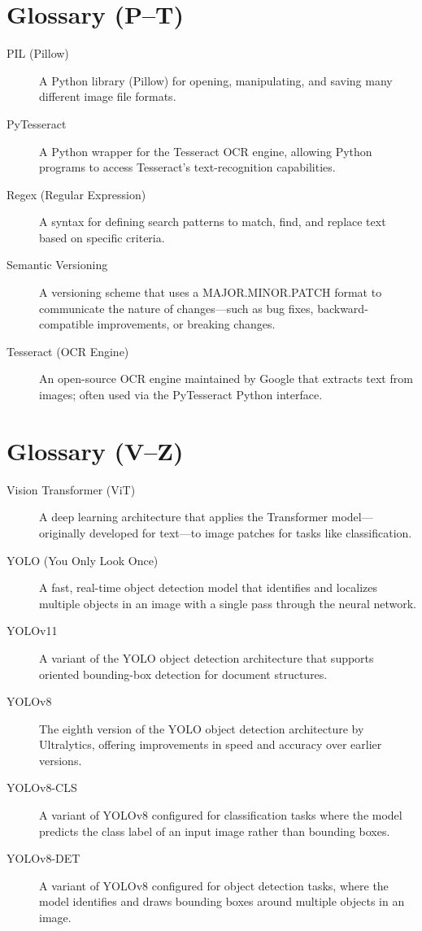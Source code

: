 \section*{Glossary (P–T)}
\begin{description}
  \item[PIL (Pillow)] 
    A Python library (Pillow) for opening, manipulating, and saving many different image file formats.
  \item[PyTesseract] 
    A Python wrapper for the Tesseract OCR engine, allowing Python programs to access 
    Tesseract’s text-recognition capabilities.
  \item[Regex (Regular Expression)] 
    A syntax for defining search patterns to match, find, and replace text based on specific criteria.
  \item[Semantic Versioning] 
    A versioning scheme that uses a MAJOR.MINOR.PATCH format to communicate the nature 
    of changes—such as bug fixes, backward-compatible improvements, or breaking changes.
  \item[Tesseract (OCR Engine)] 
    An open-source OCR engine maintained by Google that extracts text from images;  
    often used via the PyTesseract Python interface.
\end{description}
\section*{Glossary (V–Z)}
\begin{description}
  \item[Vision Transformer (ViT)] 
    A deep learning architecture that applies the Transformer model—originally developed 
    for text—to image patches for tasks like classification.
  \item[YOLO (You Only Look Once)] 
    A fast, real-time object detection model that identifies and localizes multiple 
    objects in an image with a single pass through the neural network.
  \item[YOLOv11] 
    A variant of the YOLO object detection architecture that supports oriented bounding-box 
    detection for document structures.
  \item[YOLOv8] 
    The eighth version of the YOLO object detection architecture by Ultralytics, offering 
    improvements in speed and accuracy over earlier versions.
  \item[YOLOv8-CLS] 
    A variant of YOLOv8 configured for classification tasks where the model predicts the 
    class label of an input image rather than bounding boxes.
  \item[YOLOv8-DET] 
    A variant of YOLOv8 configured for object detection tasks, where the model identifies 
    and draws bounding boxes around multiple objects in an image.
\end{description}
